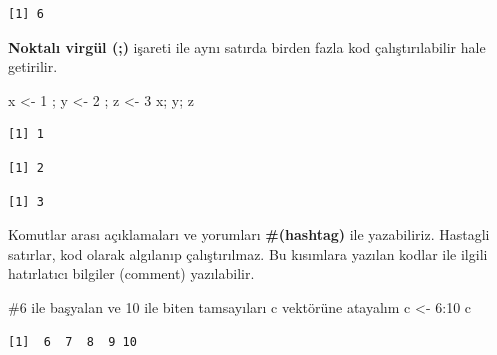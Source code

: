 \documentclass[
  letterpaper,
  DIV=11,
  numbers=noendperiod]{scrreprt}
\newenvironment{Shaded}{\begin{snugshade}}{\end{snugshade}}
\newcommand{\CommentTok}[1]{\textcolor[rgb]{0.37,0.37,0.37}{#1}}
\newcommand{\DecValTok}[1]{\textcolor[rgb]{0.68,0.00,0.00}{#1}}
\newcommand{\NormalTok}[1]{\textcolor[rgb]{0.00,0.23,0.31}{#1}}
\newcommand{\OtherTok}[1]{\textcolor[rgb]{0.00,0.23,0.31}{#1}}
\newcommand{\SpecialCharTok}[1]{\textcolor[rgb]{0.37,0.37,0.37}{#1}}
\begin{document}
\begin{verbatim}
[1] 6
\end{verbatim}

\textbf{Noktalı virgül (;)} işareti ile aynı satırda birden fazla kod
çalıştırılabilir hale getirilir.

\begin{Shaded}
\begin{Highlighting}[]
\NormalTok{x }\OtherTok{\textless{}{-}} \DecValTok{1}\NormalTok{ ; y }\OtherTok{\textless{}{-}} \DecValTok{2}\NormalTok{ ; z }\OtherTok{\textless{}{-}} \DecValTok{3}  
\NormalTok{x; y; z}
\end{Highlighting}
\end{Shaded}

\begin{verbatim}
[1] 1
\end{verbatim}

\begin{verbatim}
[1] 2
\end{verbatim}

\begin{verbatim}
[1] 3
\end{verbatim}

Komutlar arası açıklamaları ve yorumları \textbf{\#(hashtag)} ile
yazabiliriz. Hastagli satırlar, kod olarak algılanıp çalıştırılmaz. Bu
kısımlara yazılan kodlar ile ilgili hatırlatıcı bilgiler (comment)
yazılabilir.

\begin{Shaded}
\begin{Highlighting}[]
\CommentTok{\#6 ile başyalan ve  10 ile  biten tamsayıları c vektörüne atayalım  }
\NormalTok{c }\OtherTok{\textless{}{-}} \DecValTok{6}\SpecialCharTok{:}\DecValTok{10} 
\NormalTok{c}
\end{Highlighting}
\end{Shaded}

\begin{verbatim}
[1]  6  7  8  9 10
\end{verbatim}
\end{document}
